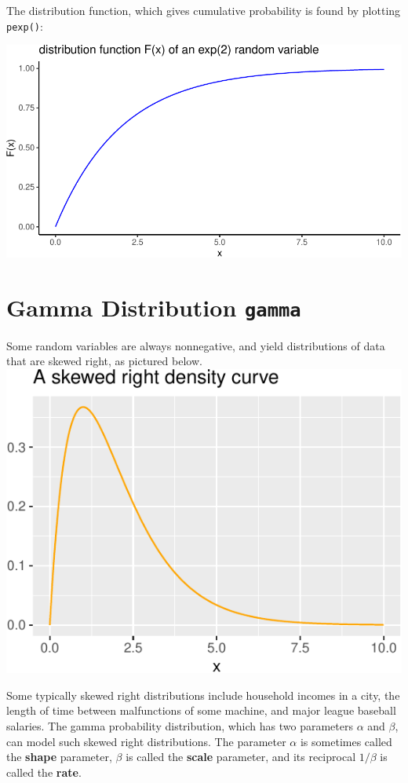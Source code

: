 \documentclass[
]{book}
\theoremstyle{definition}
\theoremstyle{definition}
\theoremstyle{definition}
\theoremstyle{definition}
\theoremstyle{remark}
\begin{document}
The distribution function, which gives cumulative probability is found by plotting \texttt{pexp()}:

\begin{center}\includegraphics{math340-notes_files/figure-latex/unnamed-chunk-186-1} \end{center}

\section{\texorpdfstring{Gamma Distribution \texttt{gamma}}{Gamma Distribution gamma}}\label{gammaR}

Some random variables are always nonnegative, and yield distributions of data that are skewed right, as pictured below.
\includegraphics{math340-notes_files/figure-latex/unnamed-chunk-188-1.pdf}

Some typically skewed right distributions include household incomes in a city, the length of time between malfunctions of some machine, and major league baseball salaries. The gamma probability distribution, which has two parameters \(\alpha\) and \(\beta\), can model such skewed right distributions. The parameter \(\alpha\) is sometimes called the \textbf{shape} parameter, \(\beta\) is called the \textbf{scale} parameter, and its reciprocal \(1/\beta\) is called the \textbf{rate}.
\end{document}
